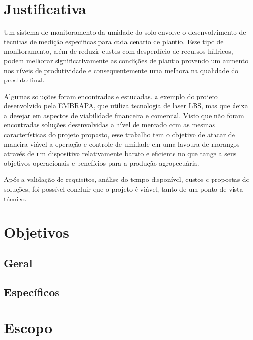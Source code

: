   \section{Justificativa}

  Um sistema de monitoramento da umidade do solo envolve o desenvolvimento de
  técnicas de medição específicas para cada cenário de plantio. Esse tipo de
  monitoramento, além de reduzir custos com desperdício de recursos hídricos,
  podem melhorar significativamente as condições de plantio provendo um aumento
  nos níveis de produtividade e consequentemente uma melhora na qualidade do
  produto final. 

  Algumas soluções foram encontradas e estudadas, a exemplo do projeto
  desenvolvido pela EMBRAPA, que utiliza tecnologia de laser LBS, mas que deixa
  a desejar em aspectos de viabilidade financeira e comercial. Visto que não
  foram encontradas soluções desenvolvidas a nível de mercado com as mesmas
  características do projeto proposto, esse trabalho tem o objetivo de atacar
  de maneira viável a operação e controle de umidade em uma lavoura de morangos
  através de um dispositivo relativamente barato e eficiente no que tange a seus
  objetivos operacionais e benefícios para a produção agropecuária.
   
  Após a validação de requisitos, análise do tempo disponível, custos e propostas
  de soluções, foi possível concluir que o projeto é viável, tanto de um ponto
  de vista técnico.

  \section{Objetivos}


  \subsection{Geral}
  \subsection{Específicos}

  \section{Escopo}
